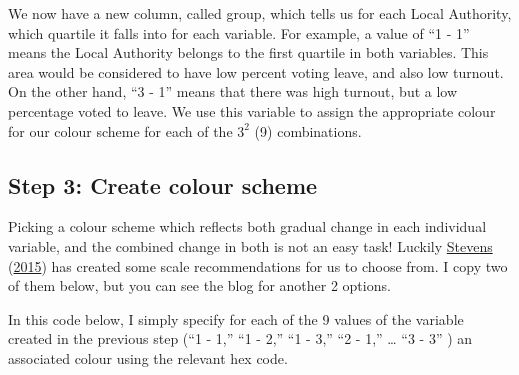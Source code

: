 \documentclass[
  krantz2]{krantz}
\begin{document}
We now have a new column, called group, which tells us for each Local Authority, which quartile it falls into for each variable. For example, a value of ``1 - 1'' means the Local Authority belongs to the first quartile in both variables. This area would be considered to have low percent voting leave, and also low turnout. On the other hand, ``3 - 1'' means that there was high turnout, but a low percentage voted to leave. We use this variable to assign the appropriate colour for our colour scheme for each of the \(3^2\) (9) combinations.

\hypertarget{step-3-create-colour-scheme}{%
\subsection{Step 3: Create colour scheme}\label{step-3-create-colour-scheme}}

Picking a colour scheme which reflects both gradual change in each individual variable, and the combined change in both is not an easy task! Luckily \protect\hyperlink{ref-Stevens_2015}{Stevens} (\protect\hyperlink{ref-Stevens_2015}{2015}) has created some scale recommendations for us to choose from. I copy two of them below, but you can see the blog for another 2 options.

In this code below, I simply specify for each of the 9 values of the variable created in the previous step (``1 - 1,'' ``1 - 2,'' ``1 - 3,'' ``2 - 1,'' \ldots{} ``3 - 3'' ) an associated colour using the relevant hex code.
\end{document}
